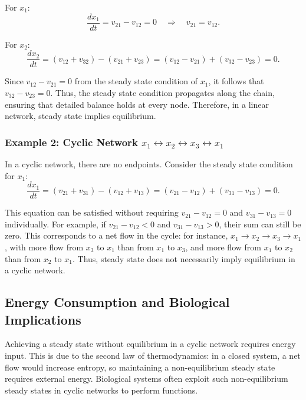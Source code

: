 \documentclass[12pt]{article}
\begin{document}
For \(x_1\):
\begin{equation}
\frac{dx_1}{dt} = v_{21} - v_{12} = 0 \quad \Rightarrow \quad v_{21} = v_{12}.
\end{equation}

For \(x_2\):
\begin{equation}
\frac{dx_2}{dt} = (v_{12} + v_{32}) - (v_{21} + v_{23}) = (v_{12} - v_{21}) + (v_{32} - v_{23}) = 0.
\end{equation}

Since \(v_{12} - v_{21} = 0\) from the steady state condition of \(x_1\), it follows that \(v_{32} - v_{23} = 0\). Thus, the steady state condition propagates along the chain, ensuring that detailed balance holds at every node. Therefore, in a linear network, steady state implies equilibrium.

\subsubsection{Example 2: Cyclic Network \(x_1 \leftrightarrow x_2 \leftrightarrow x_3 \leftrightarrow x_1\)}

In a cyclic network, there are no endpoints. Consider the steady state condition for \(x_1\):
\begin{equation}
\frac{dx_1}{dt} = (v_{21} + v_{31}) - (v_{12} + v_{13}) = (v_{21} - v_{12}) + (v_{31} - v_{13}) = 0.
\end{equation}

This equation can be satisfied without requiring \(v_{21} - v_{12} = 0\) and \(v_{31} - v_{13} = 0\) individually. For example, if \(v_{21} - v_{12} < 0\) and \(v_{31} - v_{13} > 0\), their sum can still be zero. This corresponds to a net flow in the cycle: for instance, \(x_1 \rightarrow x_2 \rightarrow x_3 \rightarrow x_1\), with more flow from \(x_3\) to \(x_1\) than from \(x_1\) to \(x_3\), and more flow from \(x_1\) to \(x_2\) than from \(x_2\) to \(x_1\). Thus, steady state does not necessarily imply equilibrium in a cyclic network.

\subsection{Energy Consumption and Biological Implications}

Achieving a steady state without equilibrium in a cyclic network requires energy input. This is due to the second law of thermodynamics: in a closed system, a net flow would increase entropy, so maintaining a non-equilibrium steady state requires external energy. Biological systems often exploit such non-equilibrium steady states in cyclic networks to perform functions.
\end{document}
